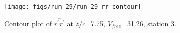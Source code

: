 \begin{figure}[H]
\centering
\texttt{[image: figs/run\_29/run\_29\_rr\_contour]}
\caption{Contour plot of $\overline{r^\prime r^\prime}$ at $z/c$=7.75, $V_{free}$=31.26, station 3.}
\label{fig:run_29_rr_contour}
\end{figure}


